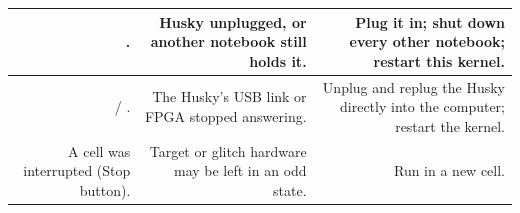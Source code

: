 \documentclass[11pt,letterpaper]{article}
\begin{document}
{\begin{longtable}{|R{0.2899}|R{0.3043}|R{0.4058}|}
. & Husky unplugged, or another notebook still holds it. & Plug it in; shut down every other notebook; restart this kernel. \\ \hline
{} / . & The Husky's USB link or FPGA stopped answering. & Unplug and replug the Husky directly into the computer; restart the kernel. \\ \hline
A cell was interrupted (Stop button). & Target or glitch hardware may be left in an odd state. & Run  in a new cell. \\ \hline
\end{longtable}}

\vspace{4pt}

\end{document}
